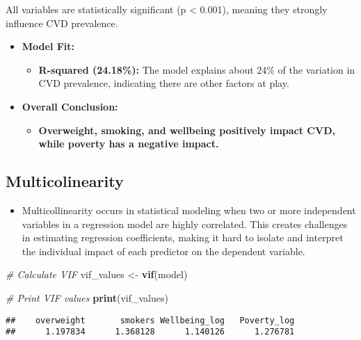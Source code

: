 \documentclass[
]{article}
\newenvironment{Shaded}{\begin{snugshade}}{\end{snugshade}}
\newcommand{\CommentTok}[1]{\textcolor[rgb]{0.56,0.35,0.01}{\textit{#1}}}
\newcommand{\FunctionTok}[1]{\textcolor[rgb]{0.13,0.29,0.53}{\textbf{#1}}}
\newcommand{\NormalTok}[1]{#1}
\newcommand{\OtherTok}[1]{\textcolor[rgb]{0.56,0.35,0.01}{#1}}
\providecommand{\tightlist}{%
  \setlength{\itemsep}{0pt}\setlength{\parskip}{0pt}}
\begin{document}
All variables are statistically significant (p \textless{} 0.001),
meaning they strongly influence CVD prevalence.

\begin{itemize}
\item
  \textbf{Model Fit:}

  \begin{itemize}
  \tightlist
  \item
    \textbf{R-squared (24.18\%):} The model explains about 24\% of the
    variation in CVD prevalence, indicating there are other factors at
    play.
  \end{itemize}
\item
  \textbf{Overall Conclusion:}

  \begin{itemize}
  \tightlist
  \item
    \textbf{Overweight, smoking, and wellbeing positively impact CVD,
    while poverty has a negative impact.}
  \end{itemize}
\end{itemize}

\subsection{Multicolinearity}\label{multicolinearity}

\begin{itemize}
\tightlist
\item
  Multicollinearity occurs in statistical modeling when two or more
  independent variables in a regression model are highly correlated.
  This creates challenges in estimating regression coefficients, making
  it hard to isolate and interpret the individual impact of each
  predictor on the dependent variable.
\end{itemize}

\begin{Shaded}
\begin{Highlighting}[]
\CommentTok{\# Calculate VIF}
\NormalTok{vif\_values }\OtherTok{\textless{}{-}} \FunctionTok{vif}\NormalTok{(model)}

\CommentTok{\# Print VIF values}
\FunctionTok{print}\NormalTok{(vif\_values)}
\end{Highlighting}
\end{Shaded}

\begin{verbatim}
##    overweight       smokers Wellbeing_log   Poverty_log 
##      1.197834      1.368128      1.140126      1.276781
\end{verbatim}
\end{document}
